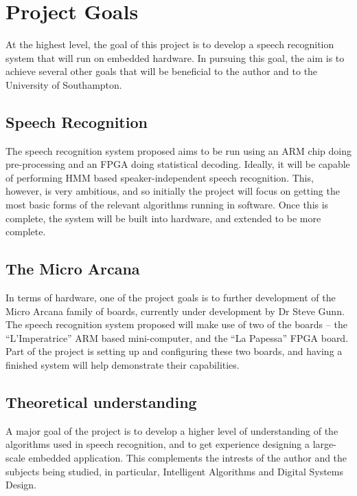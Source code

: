 \chapter{Project Goals} %
\label{cha:goals}

At the highest level, the goal of this project is to develop a speech recognition system that will run on embedded hardware.  In pursuing this goal, the aim is to achieve several other goals that will be beneficial to the author and to the University of Southampton.

\section{Speech Recognition} %
\label{sec:speech_recognition}
The speech recognition system proposed aims to be run using an ARM chip doing pre-processing and an FPGA doing statistical decoding.  Ideally, it will be capable of performing HMM based speaker-independent speech recognition.  This, however, is very ambitious, and so initially the project will focus on getting the most basic forms of the relevant algorithms running in software.  Once this is complete, the system will be built into hardware, and extended to be more complete.

\section{The Micro Arcana} %
\label{sec:the_micro_arcana}
In terms of hardware, one of the project goals is to further development of the Micro Arcana family of boards, currently under development by Dr Steve Gunn.  
The speech recognition system proposed will make use of two of the boards -- the ``L'Imperatrice'' ARM based mini-computer, and the ``La Papessa'' FPGA board.  Part of the project is setting up and configuring these two boards, and having a finished system will help demonstrate their capabilities.

\section{Theoretical understanding} %
\label{sec:theoretical_understanding}
A major goal of the project is to develop a higher level of understanding of the algorithms used in speech recognition, and to get experience designing a large-scale embedded application.  This complements the intrests of the author and the subjects being studied, in particular, Intelligent Algorithms and Digital Systems Design.


